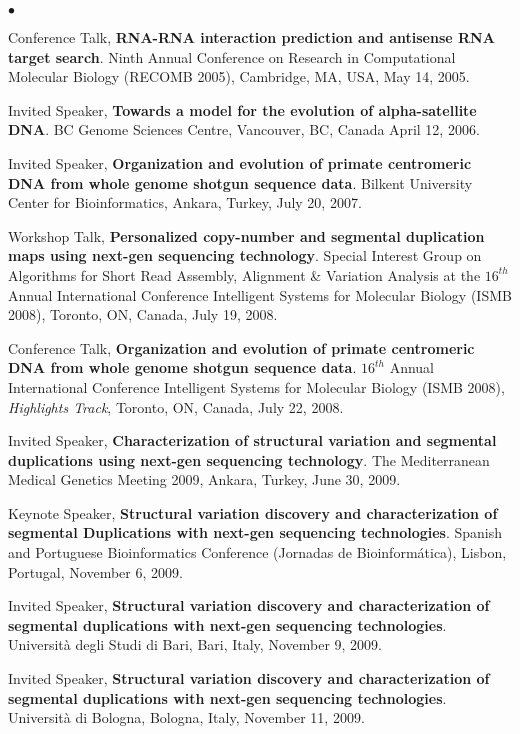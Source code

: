\documentclass[margin,line]{res}
\newenvironment{list2}{
  \begin{list}{$\bullet$}{%
      \setlength{\itemsep}{0in}
      \setlength{\parsep}{0in} \setlength{\parskip}{0in}
      \setlength{\topsep}{0in} \setlength{\partopsep}{0in} 
      \setlength{\leftmargin}{0.2in}}}{\end{list}}
\begin{document}
\begin{resume}
\begin{list2}
\item  
  Conference Talk, {\bf RNA-RNA interaction prediction and antisense RNA target search}.
  Ninth Annual Conference on Research in Computational Molecular Biology (RECOMB 2005),
  Cambridge, MA, USA, May 14, 2005.
  
\item
  Invited Speaker, {\bf Towards a model for the evolution of alpha-satellite DNA}.
  BC Genome Sciences Centre, Vancouver, BC, Canada April 12, 2006.

\item
  Invited Speaker, {\bf Organization and evolution of primate centromeric DNA
from whole genome shotgun sequence data}. Bilkent University Center for Bioinformatics,
Ankara, Turkey, July 20, 2007.


\item
  Workshop Talk, {\bf Personalized copy-number and segmental duplication maps using next-gen sequencing technology}.
Special Interest Group on Algorithms for Short Read Assembly, Alignment \& Variation Analysis at the
 $16^{th}$ Annual
International Conference Intelligent Systems for Molecular Biology (ISMB 2008),
Toronto, ON, Canada, July 19, 2008.

\item
  Conference Talk, 
  {\bf Organization and evolution of primate centromeric DNA
from whole genome shotgun sequence data}.  $16^{th}$ Annual
International Conference Intelligent Systems for Molecular Biology (ISMB 2008), {\em Highlights Track},
Toronto, ON, Canada, July 22, 2008.

\item 
  Invited Speaker, {\bf Characterization of structural variation and segmental duplications using next-gen sequencing technology}.
  The Mediterranean Medical Genetics Meeting 2009, Ankara, Turkey, June 30, 2009. 

\item 
  Keynote Speaker, {\bf Structural variation discovery and characterization of segmental Duplications with next-gen sequencing technologies}.
 Spanish and Portuguese Bioinformatics Conference (Jornadas de Bioinform\'{a}tica),
 Lisbon, Portugal, November 6, 2009.

\item 
  Invited Speaker, {\bf Structural variation discovery and characterization of segmental duplications with next-gen sequencing technologies}.
  Universit\`{a} degli Studi di Bari, 
  Bari, Italy, November 9, 2009.

\item 
  Invited Speaker, {\bf Structural variation discovery and characterization of segmental duplications with next-gen sequencing technologies}.
  Universit\`{a} di Bologna,
  Bologna, Italy, November 11, 2009.


\end{list2}
\end{resume}
\end{document}
